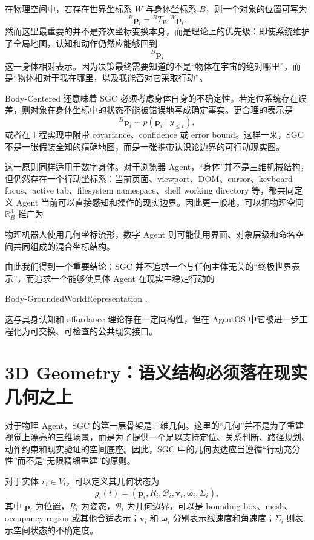 在物理空间中，若存在世界坐标系 $W$ 与身体坐标系 $B$，则一个对象的位置可写为
\[
{}^{B}\mathbf p_i
=
{}^{B}T_{W}\,
{}^{W}\mathbf p_i .
\]
然而这里最重要的并不是齐次坐标变换本身，而是理论上的优先级：即使系统维护了全局地图，认知和动作仍然应能够回到
\[
{}^{B}\mathbf p_i
\]
这一身体相对表示。因为决策最终需要知道的不是“物体在宇宙的绝对哪里”，而是“物体相对于我在哪里，以及我能否对它采取行动”。

Body-Centered 还意味着 SGC 必须考虑身体自身的不确定性。若定位系统存在误差，则对象在身体坐标中的状态不能被错误地写成确定事实。更合理的表示是
\[
{}^{B}\mathbf p_i
\sim
p(\mathbf p_i\mid y_{\leq t}),
\]
或者在工程实现中附带 covariance、confidence 或 error bound。这样一来，SGC 不是一张假装全知的精确地图，而是一张携带认识论边界的可行动现实图。

这一原则同样适用于数字身体。对于浏览器 Agent，“身体”并不是三维机械结构，但仍然存在一个行动坐标系：当前页面、viewport、DOM、cursor、keyboard focus、active tab、filesystem namespace、shell working directory 等，都共同定义 Agent 当前可以直接感知和操作的现实边界。因此更一般地，可以把物理空间 $\mathbb R_B^3$ 推广为
\begin{statementbox}
\centering
{}
\end{statementbox}
物理机器人使用几何坐标流形，数字 Agent 则可能使用界面、对象层级和命名空间共同组成的混合坐标结构。

由此我们得到一个重要结论：SGC 并不追求一个与任何主体无关的“终极世界表示”，而追求一个能够使具体 Agent 在现实中稳定行动的
\begin{statementbox}
Body-GroundedWorldRepresentation .
\end{statementbox}
这与具身认知和 affordance 理论存在一定同构性，但在 AgentOS 中它被进一步工程化为可交换、可检查的公共现实接口。

\section{3D Geometry：语义结构必须落在现实几何之上}

对于物理 Agent，SGC 的第一层骨架是三维几何。这里的“几何”并不是为了重建视觉上漂亮的三维场景，而是为了提供一个足以支持定位、关系判断、路径规划、动作约束和现实验证的空间底座。因此，SGC 中的几何表达应当遵循“行动充分性”而不是“无限精细重建”的原则。

对于实体 $v_i\in V_t$，可以定义其几何状态为
\[
g_i(t)=
\left(
\mathbf p_i,
R_i,
\mathcal B_i,
\mathbf v_i,
\boldsymbol\omega_i,
\Sigma_i
\right),
\]
其中 $\mathbf p_i$ 为位置，$R_i$ 为姿态，$\mathcal B_i$ 为几何边界，可以是 bounding box、mesh、occupancy region 或其他合适表示；$\mathbf v_i$ 和 $\boldsymbol\omega_i$ 分别表示线速度和角速度；$\Sigma_i$ 则表示空间状态的不确定度。

